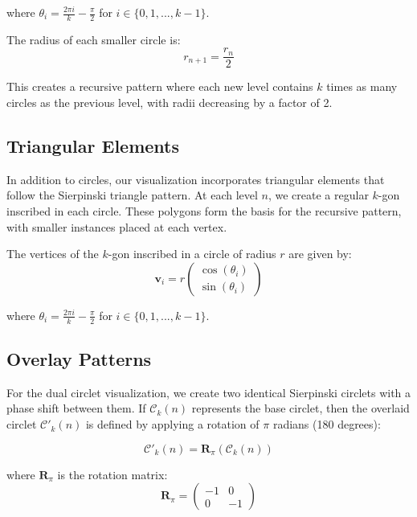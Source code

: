 \documentclass[12pt,a4paper]{article}
\begin{document}
where $\theta_i = \frac{2\pi i}{k} - \frac{\pi}{2}$ for $i \in \{0, 1, ..., k-1\}$.

The radius of each smaller circle is:
\begin{equation}
r_{n+1} = \frac{r_n}{2}
\end{equation}

This creates a recursive pattern where each new level contains $k$ times as many circles as the previous level, with radii decreasing by a factor of 2.

\subsection{Triangular Elements}
In addition to circles, our visualization incorporates triangular elements that follow the Sierpinski triangle pattern. At each level $n$, we create a regular $k$-gon inscribed in each circle. These polygons form the basis for the recursive pattern, with smaller instances placed at each vertex.

The vertices of the $k$-gon inscribed in a circle of radius $r$ are given by:
\begin{equation}
\mathbf{v}_i = r \begin{pmatrix} \cos(\theta_i) \\ \sin(\theta_i) \end{pmatrix}
\end{equation}

where $\theta_i = \frac{2\pi i}{k} - \frac{\pi}{2}$ for $i \in \{0, 1, ..., k-1\}$.

\subsection{Overlay Patterns}
For the dual circlet visualization, we create two identical Sierpinski circlets with a phase shift between them. If $\mathcal{C}_k(n)$ represents the base circlet, then the overlaid circlet $\mathcal{C}'_k(n)$ is defined by applying a rotation of $\pi$ radians (180 degrees):

\begin{equation}
\mathcal{C}'_k(n) = \mathbf{R}_{\pi}(\mathcal{C}_k(n))
\end{equation}

where $\mathbf{R}_{\pi}$ is the rotation matrix:
\begin{equation}
\mathbf{R}_{\pi} = \begin{pmatrix} -1 & 0 \\ 0 & -1 \end{pmatrix}
\end{equation}
\end{document}

